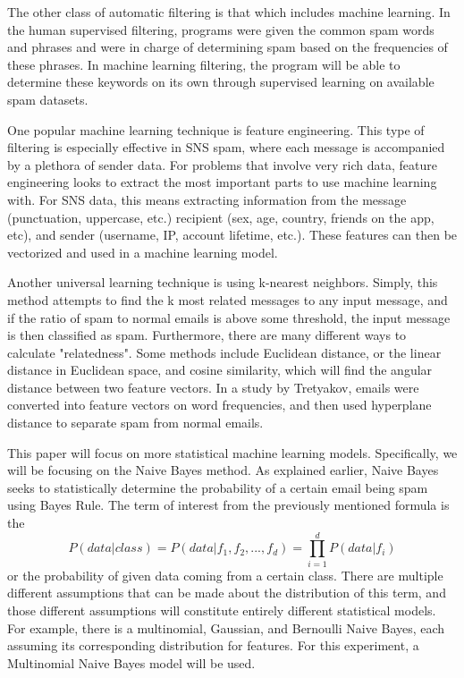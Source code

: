 \documentclass{article}
\begin{document}
\begin{paragraph}
The other class of automatic filtering is that which includes machine learning. In the human supervised filtering, programs were given the common spam words and phrases and were in charge of determining spam based on the frequencies of these phrases. In machine learning filtering, the program will be able to determine these keywords on its own through supervised learning on available spam datasets.
\end{paragraph}
\begin{paragraph}
One popular machine learning technique is feature engineering. This type of filtering is especially effective in SNS spam, where each message is accompanied by a plethora of sender data. For problems that involve very rich data, feature engineering looks to extract the most important parts to use machine learning with. For SNS data, this means extracting information from the message (punctuation, uppercase, etc.) recipient (sex, age, country, friends on the app, etc), and sender (username, IP, account lifetime, etc.). These features can then be vectorized and used in a machine learning model. 
\cite{lupher1feature}
\end{paragraph}
\begin{paragraph}
Another universal learning technique is using k-nearest neighbors. Simply, this method attempts to find the k most related messages to any input message, and if the ratio of spam to normal emails is above some threshold, the input message is then classified as spam. Furthermore, there are many different ways to calculate "relatedness". Some methods include Euclidean distance, or the linear distance in Euclidean space, and cosine similarity, which will find the angular distance between two feature vectors. In a study by Tretyakov, emails were converted into feature vectors on word frequencies, and then used hyperplane distance to separate spam from normal emails. 
\cite{budanovic_letic_jovanovic_2020}
\end{paragraph}
\begin{paragraph}
This paper will focus on more statistical machine learning models. Specifically, we will be focusing on the Naive Bayes method. As explained earlier, Naive Bayes seeks to statistically determine the probability of a certain email being spam using Bayes Rule. The term of interest from the previously mentioned formula is the
\begin{equation}
    P(data|class) = P(data|f_1, f_2, ..., f_d) = \prod_{i=1}^{d} P(data|f_i)
\end{equation}
or the probability of given data coming from a certain class. There are multiple different assumptions that can be made about the distribution of this term, and those different assumptions will constitute entirely different statistical models. For example, there is a multinomial, Gaussian, and Bernoulli Naive Bayes, each assuming its corresponding distribution for features. For this experiment, a Multinomial Naive Bayes model will be used.
\cite{kibriya2004multinomial}
\cite{metsis2006spam}
\end{paragraph}
\end{document}

